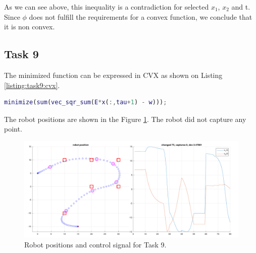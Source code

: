 As we can see above, this inequality is a contradiction for selected $x_{1}$, $x_{2}$ and t. Since $\phi$ does not fulfill the requirements for a convex function, we conclude that it is non convex.

\subsection {Task 9}

The minimized function can be expressed in CVX as shown on Listing \ref{listing:task9:cvx}.

\begin{lstlisting}[language=Matlab, caption=CVX code for task 9., label=listing:task9:cvx]
minimize(sum(vec_sqr_sum(E*x(:,tau+1) - w)));
\end{lstlisting}

The robot positions are shown in the Figure \ref{fig:task9:graph}. The robot did not capture any point.

\begin{figure}[!htb]
    \centering    
    \includegraphics[width=1\linewidth]{part1/figures/task_9.pdf}
    \caption{Robot positions and control signal for Task 9.}
    \label{fig:task9:graph}
\end{figure}

